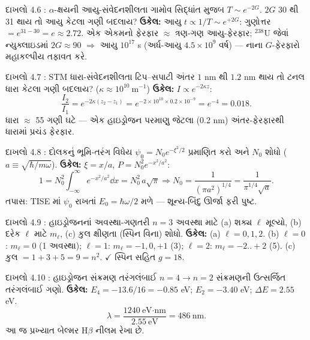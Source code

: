 \begin{dahlo}{દાખલો 4.6 : $\alpha$-ક્ષયની આયુ-સંવેદનશીલતા}
ગામોવ સિદ્ધાંત મુજબ $T\sim e^{-2G}$. $2G$ 30 થી 31 થાય તો આયુ કેટલા ગણી બદલાય?
\tcblower
\textbf{ઉકેલ:} આયુ $t\propto1/T\sim e^{+2G}$: ગુણોત્તર $=e^{31-30}=e\approx2.72$.
એક એકમનો ફેરફાર $\approx$ ત્રણ-ગણ આયુ-ફેરફાર; $^{238}$U જેવાં ન્યુક્લાઇડમાં $2G\approx90$ $\Rightarrow$ આયુ $10^{17}$ s (અર્ધ-આયુ $4.5\times10^{9}$ વર્ષ) — નાના $G$-ફેરફારો મહાકલ્પીય તફાવત કરે.
\end{dahlo}

\begin{dahlo}{દાખલો 4.7 : STM ધારા-સંવેદનશીલતા}
ટિપ–સપાટી અંતર $1$ nm થી $1.2$ nm થાય તો ટનલ ધારા કેટલા ગણી બદલાય? ($\kappa\approx10^{10}\ \mathrm{m}^{-1}$)
\tcblower
\textbf{ઉકેલ:} $I\propto e^{-2\kappa z}$:
\[
\frac{I_2}{I_1}=e^{-2\kappa(z_2-z_1)}=e^{-2\times10^{10}\times0.2\times10^{-9}}=e^{-4}=0.018 .
\]
ધારા $\approx$ 55 ગણી ઘટે — એક હાઇડ્રોજન પરમાણુ જેટલા (0.2 nm) અંતર-ફેરફારથી ધારામાં પ્રચંડ ફેરફાર.
\end{dahlo}

\begin{dahlo}{દાખલો 4.8 : દોલકનું ભૂમિ-તરંગ વિધેય}
$\psi_0=N_0e^{-\xi^{2}/2}$ પ્રમાણિત કરો અને $N_0$ શોધો ($a\equiv\sqrt{\hbar/m\omega}$).
\tcblower
\textbf{ઉકેલ:} $\xi=x/a$, $P=N_0^{2}e^{-x^{2}/a^{2}}$:
\[
1=N_0^{2}\int_{-\infty}^{\infty}e^{-x^{2}/a^{2}}\dd x=N_0^{2}\,a\sqrt{\pi}
\Rightarrow N_0=\frac{1}{(\pi a^{2})^{1/4}}=\frac{1}{\pi^{1/4}\sqrt{a}} .
\]
તપાસ: TISE માં $\psi_0$ રાખતાં $E_0=\hbar\omega/2$ મળે — શૂન્ય-બિંદુ ઊર્જા ફરી પુષ્ટ.
\end{dahlo}

\begin{dahlo}{દાખલો 4.9 : હાઇડ્રોજનનાં અવસ્થા-ગણતરી}
$n=3$ અવસ્થા માટે (a) શક્ય $\ell$ મૂલ્યો, (b) દરેક $\ell$ માટે $m_\ell$, (c) કુલ ક્ષીણતા (સ્પિન વિના) શોધો.
\tcblower
\textbf{ઉકેલ:} (a) $\ell=0,1,2$.
(b) $\ell=0$: $m_\ell=0$ (1 અવસ્થા); $\ell=1$: $m_\ell=-1,0,+1$ (3); $\ell=2$: $m_\ell=-2..+2$ (5).
(c) કુલ $=1+3+5=9=n^{2}$. $\checkmark$ સ્પિન સહિત $g=18$.
\end{dahlo}

\begin{dahlo}{દાખલો 4.10 : હાઇડ્રોજન સંક્રમણ તરંગલંબાઈ}
$n=4\to n=2$ સંક્રમણની ઉત્સર્જિત તરંગલંબાઈ ગણો.
\tcblower
\textbf{ઉકેલ:} $E_4=-13.6/16=-0.85$ eV; $E_2=-3.40$ eV; $\Delta E=2.55$ eV.
\[
\lambda=\frac{1240\ \text{eV·nm}}{2.55\ \text{eV}}=486\ \text{nm}.
\]
આ જ પ્રખ્યાત બેલ્મર H$\beta$ નીલમ રેખા છે.
\end{dahlo}

